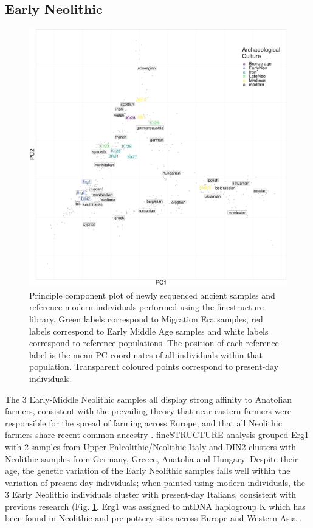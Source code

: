 \subsection{Early Neolithic}

\begin{figure}[htp]
    \centering
    \includegraphics[width=1.0\textwidth]{../images/chapter4/chunklengths_moderns_ancients_PCA.pdf}
    \caption{Principle component plot of newly sequenced ancient samples and reference modern individuals performed using the finestructure library. Green labels correspond to Migration Era samples, red labels correspond to Early Middle Age samples and white labels correspond to reference populations. The position of each reference label is the mean PC coordinates of all individuals within that population. Transparent coloured points correspond to present-day individuals.}
    \label{fig:chunklengths_moderns_ancients_PCA_bav}
\end{figure}

The 3 Early-Middle Neolithic samples all display strong affinity to Anatolian farmers, consistent with the prevailing theory that near-eastern farmers were responsible for the spread of farming across Europe, and that all Neolithic farmers share recent common ancestry \cite{Haak2010, haak2005ancient, bramanti2009genetic, Lazaridis2014}. fineSTRUCTURE analysis grouped Erg1 with 2 samples from Upper Paleolithic/Neolithic Italy and DIN2 clusters with Neolithic samples from Germany, Greece, Anatolia and Hungary. Despite their age, the genetic variation of the Early Neolithic samples falls well within the variation of present-day individuals; when painted using modern individuals, the 3 Early Neolithic individuals cluster with present-day Italians, consistent with previous research \cite{Lazaridis2014, Haak2015} (Fig. \ref{fig:chunklengths_moderns_ancients_PCA_bav}. Erg1 was assigned to mtDNA haplogroup K which has been found in Neolithic and pre-pottery sites across Europe \cite{Hofmanova2016, fernandez2014ancient} and Western Asia \cite{Lazaridis2016, Mathieson2015}. 

